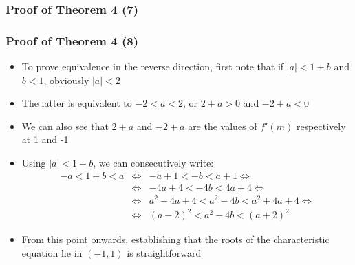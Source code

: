 \documentclass[10pt,usenames,dvipsnames]{beamer}
\theoremstyle{plain}
\theoremstyle{definition}
\begin{document}
\begin{frame}[fragile]
\frametitle{Proof of Theorem 4 (7)}
\begin{center}
\end{center} 
\end{frame}

\begin{frame}[fragile]
\frametitle{Proof of Theorem 4 (8)}
\begin{itemize}
	\item To prove equivalence in the reverse direction, first note that if $|a| < 1 + b$ and $b < 1$, obviously $|a| < 2$
	\item The latter is equivalent to $-2 < a < 2$, or $2 + a > 0$ and $-2 + a < 0$
	\item We can also see that $2 + a$ and $-2 + a$ are the values of $f'(m)$ respectively at 1 and -1
	\item Using $|a| < 1 + b$, we can consecutively write:
	\[
		\begin{array}{lcl}
			-a < 1 + b < a & \Leftrightarrow & -a + 1 < -b < a + 1 \Leftrightarrow \\
			& \Leftrightarrow & -4a + 4 < -4b < 4a + 4 \Leftrightarrow\\
			& \Leftrightarrow & a^{2} - 4a + 4 < a^{2} - 4b < a^{2} + 4a + 4 \Leftrightarrow\\
			& \Leftrightarrow & (a - 2)^{2} < a^{2} - 4b < (a + 2)^{2} 			
		\end{array}
	\]
	\item From this point onwards, establishing that the roots of the characteristic equation lie in $(-1,1)$ is straightforward
\end{itemize}
\end{frame}
\end{document}
